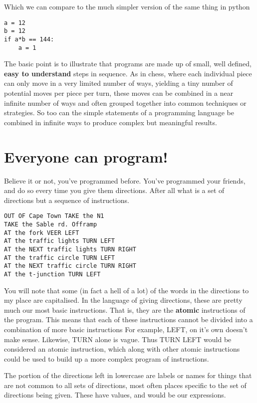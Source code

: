 Which we can compare to the much simpler version of the same thing   in python
\begin{lstlisting}
a = 12
b = 12
if a*b == 144:
    a = 1
\end{lstlisting}

The basic point is to illustrate that programs are made up of small,   well defined, \textbf{easy to understand} steps in sequence. As   in chess, where each individual piece can only move in a very limited   number of ways, yielding a tiny number of potential moves per piece per   turn, these moves can be combined in a near infinite number of ways and   often grouped together into common techniques or strategies. So too can   the simple statements of a programming language be combined in infinite   ways to produce complex but meaningful results.

\section{Everyone can program!}

Believe it or not, you've programmed before. You've programmed your   friends, and do so every time you give them directions.  After all what   is a set of directions but a sequence of instructions.
\begin{lstlisting}
OUT OF Cape Town TAKE the N1
TAKE the Sable rd. Offramp
AT the fork VEER LEFT
AT the traffic lights TURN LEFT
AT the NEXT traffic lights TURN RIGHT 
AT the traffic circle TURN LEFT
AT the NEXT traffic circle TURN RIGHT 
AT the t-junction TURN LEFT
\end{lstlisting}

You will note that some (in fact a hell of a lot) of the words in   the directions to my place are capitalised. In the language of giving   directions, these are pretty much our most basic instructions. That is, they are the \textbf{atomic} instructions of the program. This means that each of these instructions cannot be divided into a combination of more basic instructions For example, LEFT, on it's own doesn't make sense. Likewise, TURN alone is vague. Thus TURN LEFT would be considered an atomic instruction, which along with other atomic instructions could be used to build up a more complex program of instructions.

The portion   of the directions left in lowercase are labels or names for things that   are not common to all sets of directions, most often places specific to   the set of directions being given. These have values, and would be our   expressions.

